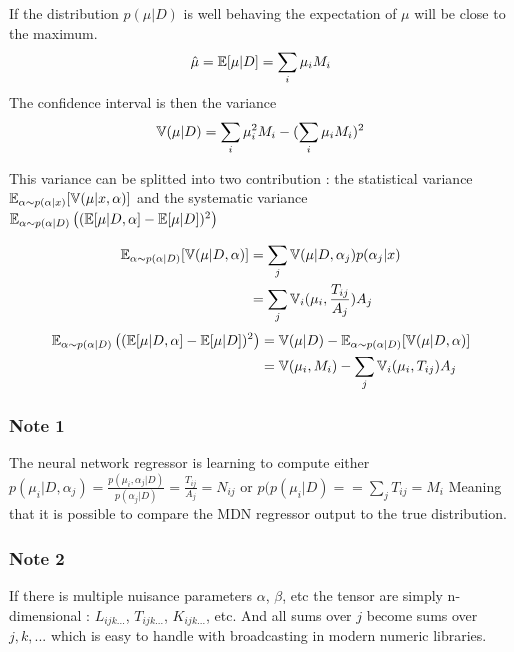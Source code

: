If the distribution $p(\mu | D)$ is well behaving the expectation of $\mu$ will be close to the maximum.
\begin{equation}
	\hat\mu = \mathbb{E}[\mu|D] = \sum_i \mu_i M_i
\end{equation}
The confidence interval is then the variance
\begin{equation}
	\mathbb{V}(\mu|D) = \sum_i \mu_i^2 M_i - (\sum_i \mu_i M_i)^2
\end{equation}

This variance can be splitted into two contribution : the statistical variance $\mathbb{E}_{\alpha \sim p(\alpha|x)}[ \mathbb{V}(\mu|x, \alpha) ]$ and the systematic variance $\mathbb{E}_{\alpha \sim p(\alpha|D)} \left ((\mathbb{E} [\mu|D, \alpha]  - \mathbb{E}[\mu|D])^2\right )$

\begin{align}
	\mathbb{E}_{\alpha \sim p(\alpha|D)}[ \mathbb{V}(\mu|D, \alpha) ] 
			&= \sum_j \mathbb{V}(\mu|D, \alpha_j) p(\alpha_j | x) \\
			&= \sum_j \mathbb{V}_i(\mu_i, \frac{T_{ij}}{A_j}) A_j
\end{align}
\begin{align}
	\mathbb{E}_{\alpha \sim p(\alpha|D)} \left ((\mathbb{E} [\mu|D, \alpha]  - \mathbb{E}[\mu|D])^2\right ) 
			&= \mathbb{V}(\mu|D) - \mathbb{E}_{\alpha \sim p(\alpha|D)}[ \mathbb{V}(\mu|D, \alpha) ] \\
			&= \mathbb{V}(\mu_i, M_i) - \sum_j \mathbb{V}_i(\mu_i, T_{ij}) A_j
\end{align}

\subsubsection{Note 1}

The neural network regressor is learning to compute either $p(\mu_i |D, \alpha_j) = \frac{p(\mu_i, \alpha_j | D)}{p(\alpha_j | D)} = \frac{T_{ij}}{A_j} = N_{ij}$ or $p(p(\mu_i |D) = = \sum_j T_{ij} = M_i$
Meaning that it is possible to compare the MDN regressor output to the true distribution.


\subsubsection{Note 2}

If there is multiple nuisance parameters $\alpha$, $\beta$, etc the tensor are simply n-dimensional : $L_{ijk...}$, $T_{ijk...}$, $K_{ijk...}$, etc.
And all sums over $j$ become sums over $j,k, ...$ which is easy to handle with broadcasting in modern numeric libraries.











